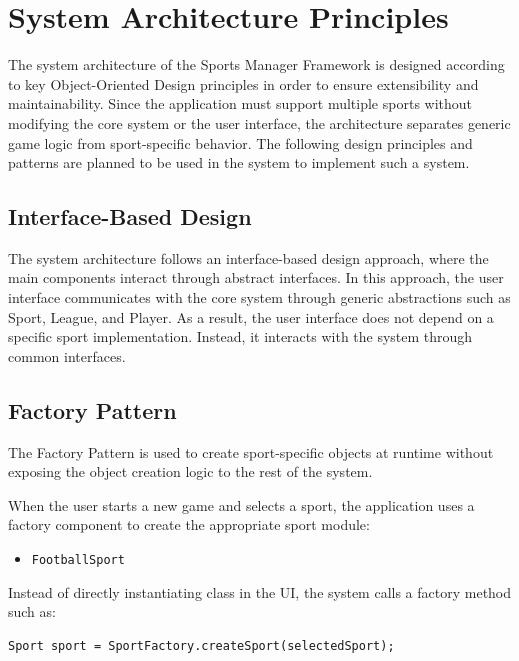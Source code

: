 \documentclass[12pt, a4paper]{article}
\begin{document}
\section{System Architecture Principles}

The system architecture of the Sports Manager Framework is designed according to key
Object-Oriented Design principles in order to ensure extensibility and maintainability.
Since the application must support multiple sports without modifying the core system or the
user interface, the architecture separates generic game logic from sport-specific behavior.
The following design principles and patterns are planned to be used in the system to
implement such a system.

\subsection{Interface-Based Design}

The system architecture follows an interface-based design approach, where the main
components interact through abstract interfaces. In this approach, the user interface
communicates with the core system through generic abstractions such as Sport, League, and
Player. As a result, the user interface does not depend on a specific sport implementation.
Instead, it interacts with the system through common interfaces.

\subsection{Factory Pattern}

The Factory Pattern is used to create sport-specific objects at runtime without exposing the
object creation logic to the rest of the system.

When the user starts a new game and selects a sport, the application uses a factory
component to create the appropriate sport module:
\begin{itemize}
    \item[\textrightarrow] \texttt{FootballSport}
\end{itemize}

Instead of directly instantiating class in the UI, the system calls a factory method such as:
\begin{lstlisting}
Sport sport = SportFactory.createSport(selectedSport);
\end{lstlisting}
\end{document}
